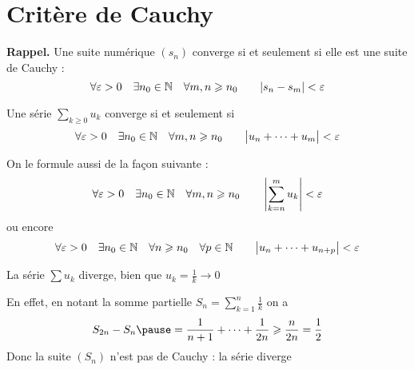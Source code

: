 \section{Critère de Cauchy}

\begin{frame}
\textbf{Rappel.}
Une suite numérique $(s_n)$ converge 
si et seulement si elle est une suite de Cauchy :
\pause
$$\forall \varepsilon>0\quad \exists n_0\in\mathbb{N} \quad \forall m,n \geqslant n_0 \qquad |s_n-s_m|<\varepsilon$$

\pause
\begin{theoreme}
Une série  $\displaystyle\sum_{k\geq0} u_k$ converge si et seulement si  
$$\forall \varepsilon>0 \quad \exists n_0\in\mathbb{N} \quad \forall m,n\geqslant n_0 \qquad \big|u_{n}+\cdots +u_m\big| < \varepsilon $$
\end{theoreme}

\pause
On le formule aussi de la façon suivante :
$$ \forall \varepsilon>0 \quad \exists n_0\in\mathbb{N} \quad
\forall m,n \geqslant n_0 \qquad  \left| \sum_{k=n}^m u_k\right| <\varepsilon$$
\pause
ou encore
$$ \forall \varepsilon>0 \quad \exists n_0\in\mathbb{N} \quad
\forall n\geqslant n_0 \quad \forall p\in\mathbb{N} 
\qquad  \big|u_{n}+\cdots +u_{n+p}\big|<\varepsilon$$

\end{frame}


\begin{frame}


\pause
{} La série $\sum u_k$ diverge, bien que $u_k = \frac{1}{k} \to 0$

\pause
\vspace{.2cm}
En effet, en notant la somme partielle $S_n = \sum_{k=1}^{n} \frac{1}{k}$
on a
$$
S_{2n}-S_{n} \pause= \frac{1}{n+1}+\cdots+\frac{1}{2n}\ge
\frac{n}{2n}=\frac{1}{2} 
$$
\pause
Donc la suite $\left(S_n\right)$ n'est pas de Cauchy : la série diverge


\end{frame}


